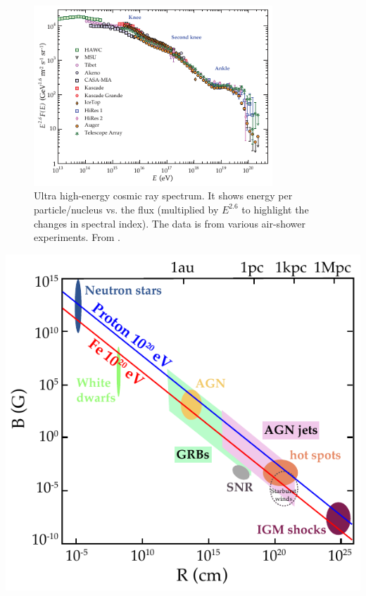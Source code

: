 \documentclass[
    a4paper, %
    fontsize=10pt, %
    twoside=false, %
    numbers=noenddot, %
    fontmethod=tex,
]{kaobook}
\begin{document}
\begin{figure}[htb]
    \includegraphics[width=0.8\textwidth]{theory/cr_uhecr_spectrum.pdf}
    \caption[UHECR spectrum]{Ultra high-energy cosmic ray spectrum. It shows energy per particle/nucleus vs. the flux (multiplied by $E^{2.6}$ to highlight the changes in spectral index). The data is from various air-shower experiments. From \cite{Workman2022}.}
\end{figure}
\begin{marginfigure}
    \includegraphics{theory/uhecr_hillas_criterion.pdf}
    \caption[Hillas source distribution]{Possible sources for \SI{e20}{\eV} cosmic rays, as a function of source radius $R$ and the magnetic field strength $B$ of the source. Adapted from \cite{Rieger2022}, original `Hillas plot' in \cite{Hillas1984}.}
\end{marginfigure}
\end{document}
